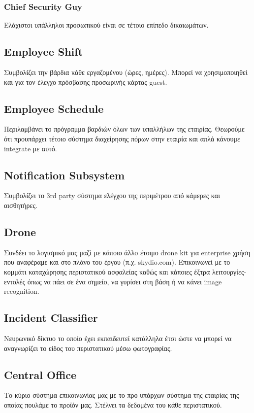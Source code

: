 \documentclass{article}
\begin{document}
\subsubsection{Chief Security Guy}
Ελάχιστοι υπάλληλοι προσωπικού είναι σε τέτοιο επίπεδο δικαιωμάτων. 

\subsection{Employee Shift}
Συμβολίζει την βάρδια κάθε εργαζομένου (ώρες, ημέρες). Μπορεί να χρησιμοποιηθεί και για τον έλεγχο πρόσβασης προσωρινής κάρτας guest.

\subsection{Employee Schedule}
Περιλαμβάνει το πρόγραμμα βαρδιών όλων των υπαλλήλων της εταιρίας. Θεωρούμε ότι προυπάρχει τέτοιο σύστημα διαχείρησης πόρων στην εταιρία και απλά κάνουμε integrate με αυτό.

\subsection{Notification Subsystem}
Συμβολίζει το 3rd party σύστημα ελέγχου της περιμέτρου από κάμερες και αισθητήρες.

\subsection{Drone}
Συνδέει το λογισμικό μας μαζί με κάποιο άλλο έτοιμο drone kit για enterprise χρήση που αναφέραμε και στο πλάνο του έργου (π.χ. skydio.com). Επικοινωνεί με το κομμάτι καταχώρησης περιστατικού ασφαλείας καθώς και κάποιες έξτρα λειτουργίες-εντολές όπως να πάει σε ένα σημείο, να γυρίσει στη βάση ή να κάνει image recognition.

\subsection{Incident Classifier}
Νευρωνικό δίκτυο το οποίο έχει εκπαιδευτεί κατάλληλα έτσι ώστε να μπορεί να αναγνωρίζει το είδος του περιστατικού μέσω φωτογραφίας.

\subsection{Central Office}
Το κύριο σύστημα επικοινωνίας μας με το προ-υπάρχων σύστημα της εταιρίας της οποίας πουλάμε το προϊόν μας. Στέλνει τα δεδομένα του κάθε περιστατικού.
\end{document}
